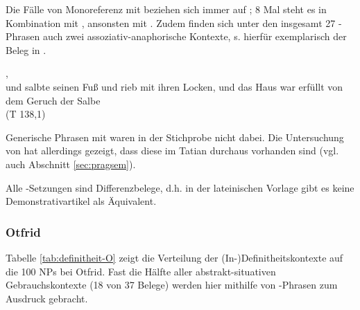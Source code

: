 
 Die Fälle von Monoreferenz mit  beziehen sich immer auf ; 8 Mal steht es in Kombination mit , ansonsten mit . Zudem finden sich unter den insgesamt 27 -Phrasen auch zwei assoziativ-anaphorische Kontexte, s. hierfür exemplarisch der Beleg in . 

%

\begin{exe}
\ex \label{ex:T27561} \gll {}        ,            \\
{und} {salbte} {seinen } {Fuß} {und} {rieb} {mit} {ihren} {Locken}, {und} {das} {Haus} {war} {erfüllt} {von} {dem} {Geruch} {der} {Salbe} \\
\glt {} (T 138,1)
\end{exe}

Generische Phrasen mit  waren in der Stichprobe nicht dabei. Die Untersuchung von \textcite{Oubouzar1989,Oubouzar1992} hat allerdings gezeigt, dass diese im Tatian durchaus vorhanden sind (vgl. auch Abschnitt \ref{sec:pragsem}).

Alle -Setzungen sind Differenzbelege, d.h. in der lateinischen Vorlage gibt es keine Demonstrativartikel als Äquivalent.

\subsubsection{Otfrid} 

Tabelle \ref{tab:definitheit-O} zeigt die Verteilung  der (In-)Definitheitskontexte auf die 100 NPs bei Otfrid. Fast die Hälfte aller abstrakt-situativen Gebrauchskontexte (18 von 37 Belege) werden hier mithilfe von -Phrasen zum Ausdruck gebracht.

